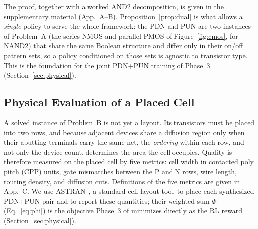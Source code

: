 \noindent
The proof, together with a worked AND2 decomposition, is given in the
supplementary material (App.~A--B).
Proposition~\ref{prop:dual} is what allows a \emph{single} policy to serve the
whole framework: the PDN and PUN are two instances of Problem~A (the series
NMOS and parallel PMOS of Figure~\ref{fig:cmos}, for NAND2) that share the same
Boolean structure and differ only in their on/off pattern sets, so a policy
conditioned on those sets is agnostic to transistor type.
This is the foundation for the joint PDN+PUN training of Phase~3
(Section~\ref{sec:physical}).


\subsection{Physical Evaluation of a Placed Cell}
\label{sec:pre_phys}

A solved instance of Problem~B is not yet a layout.
Its transistors must be placed into two rows, and because adjacent devices
share a diffusion region only when their abutting terminals carry the same
net, the \emph{ordering} within each row, and not only the device count,
determines the area the cell occupies.
Quality is therefore measured on the placed cell by five metrics: cell width
in contacted poly pitch (CPP) units, gate mismatches between the P and N rows,
wire length, routing density, and diffusion cuts. Definitions of the five metrics are given in App.~C.
We use ASTRAN~\cite{astran}, a standard-cell layout tool, to place each
synthesized PDN+PUN pair and to report these quantities; their weighted sum
$\Phi$ (Eq.~\ref{eq:phi}) is the objective Phase~3 of \method{} minimizes
directly as the RL reward (Section~\ref{sec:physical}).






